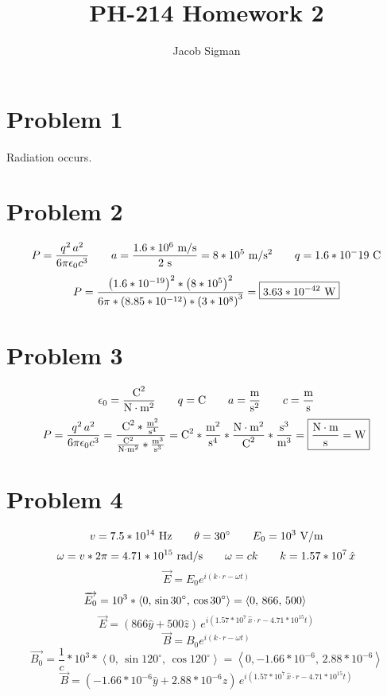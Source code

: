 \documentclass{article}
\title{PH-214 Homework 2}
\author{Jacob Sigman}
\date{}
\begin{document}
\maketitle
\section*{Problem 1}
Radiation occurs.
\section*{Problem 2}
\[P=\frac{q^2\,a^2}{6\pi\epsilon_0c^3}\hspace{7 mm}a=\frac{1.6*10^6 \textnormal{ m/s}}{2 \textnormal{ s}}=8*10^5 \textnormal{ m/}\textnormal{s}^2\hspace{7 mm}q=1.6*10^-19 \textnormal{ C}\]
\[P=\frac{\left(1.6*10^{-19}\right)^2*\left(8*10^5\right)^2}{6\pi*\left(8.85*10^{-12}\right)*\left(3*10^8\right)^3}=\boxed{3.63*10^{-42} \textnormal{ W}}\]
\section*{Problem 3}
\[\epsilon_0=\frac{\textnormal{C}^2}{\textnormal{N}\cdot\textnormal{m}^2}\hspace{7 mm}q=\textnormal{C}\hspace{7 mm}a=\frac{\textnormal{m}}{\textnormal{s}^2}\hspace{7 mm}c=\frac{\textnormal{m}}{\textnormal{s}}\]
\[P=\frac{q^2\,a^2}{6\pi\epsilon_0c^3}=\frac{\textnormal{C}^2*\frac{\textnormal{m}^2}{\textnormal{s}^4}}{\frac{\textnormal{C}^2}{\textnormal{N}\cdot\textnormal{m}^2}*\frac{\textnormal{m}^3}{\textnormal{s}^3}}=\textnormal{C}^2*\frac{\textnormal{m}^2}{\textnormal{s}^4}*\frac{\textnormal{N}\cdot\textnormal{m}^2}{\textnormal{C}^2}*\frac{\textnormal{s}^3}{\textnormal{m}^3}=\boxed{\frac{\textnormal{N}\cdot\textnormal{m}}{\textnormal{s}}=\textnormal{W}}\]
\section*{Problem 4}
\[v=7.5*10^{14}\textnormal{ Hz}\hspace{7 mm}\theta=30^{\circ}\hspace{7 mm}E_0=10^3 \textnormal{ V/m}\]
\[\omega=v*2\pi=4.71*10^{15}\textnormal{ rad/s}\hspace{7 mm}\omega=ck\hspace{7 mm}k=1.57*10^7\,\hat{x}\]
\[\overrightarrow{E}=E_0e^{i(k\cdot r-\omega t)}\]
\[\overrightarrow{E_0}=10^3*\left<0,\,\sin30^{\circ},\,\cos30^{\circ}\right>=\left<0,\,866,\,500\right>\hspace{7 mm}\]
\[\overrightarrow{E}=\boxed{(866\hat{y}+500\hat{z})\,e^{i(1.57*10^7\,\hat{x}\cdot r-4.71*10^{15} t)}}\]
\[\overrightarrow{B}=B_0e^{i(k\cdot r-\omega t)}\]
\[\overrightarrow{B_0}=\frac{1}{c}*10^3*\left<0,\,\sin120^{\circ},\,\cos120^{\circ}\right>=\left<0,-1.66*10^{-6},\,2.88*10^{-6}\right>\]
\[\overrightarrow{B}=\boxed{(-1.66*10^{-6}\hat{y}+2.88*10^{-6}\hat{z})\,e^{i(1.57*10^7\,\hat{x}\cdot r-4.71*10^{15} t)}}\]
\end{document}
